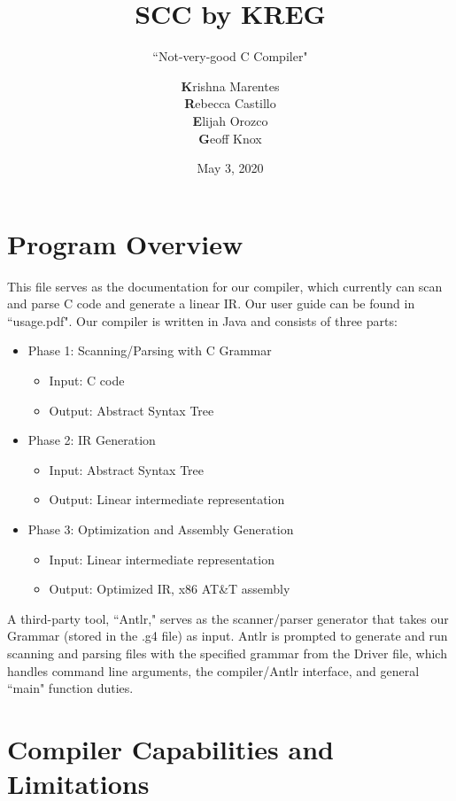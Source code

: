 \documentclass{scrartcl}
\title{SCC by KREG}
\subtitle{``Not-very-good C Compiler"}
\author{\textbf{K}rishna Marentes\\\textbf{R}ebecca Castillo\\\textbf{E}lijah Orozco\\\textbf{G}eoff Knox}
\date{May 3, 2020}
\begin{document}
\maketitle
\tableofcontents

\section{Program Overview}
This file serves as the documentation for our compiler, which currently can scan and parse C code and generate a linear IR. Our user guide can be found in ``usage.pdf". Our compiler is written in Java and consists of three parts:
\begin{itemize}
    \item Phase 1: Scanning/Parsing with C Grammar
    \begin{itemize}
        \item Input: C code
        \item Output: Abstract Syntax Tree
    \end{itemize}
    \item Phase 2: IR Generation
    \begin{itemize}
        \item Input: Abstract Syntax Tree
        \item Output: Linear intermediate representation
    \end{itemize}
    \item Phase 3: Optimization and Assembly Generation
    \begin{itemize}
        \item Input: Linear intermediate representation
        \item Output: Optimized IR, x86 AT\&T assembly
    \end{itemize}
\end{itemize}
A third-party tool, ``Antlr," serves as the scanner/parser generator that takes our Grammar (stored in the .g4 file) as input. Antlr is prompted to generate and run scanning and parsing files with the specified grammar from the Driver file, which handles command line arguments, the compiler/Antlr interface, and general ``main" function duties.

\section{Compiler Capabilities and Limitations}
\end{document}
